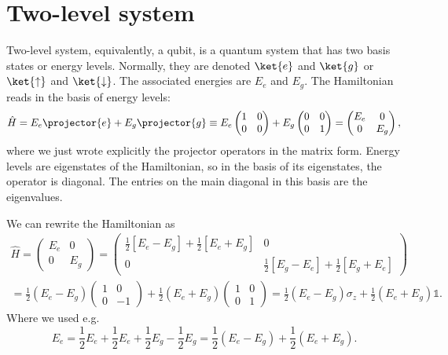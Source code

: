 \documentclass[fontsize=9pt,bookmarkpackage=false]{scrartcl}
\begin{document}
\section*{Two-level system} %
\label{sec:two_level_system}

Two-level system, equivalently, a qubit, is a quantum system that has two basis states or energy levels.
Normally, they are denoted $\ket{e}$ and $\ket{g}$ or $\ket{\uparrow}$ and $\ket{\downarrow}$.
The associated energies are $E_e$ and $E_g$.
The Hamiltonian reads in the basis of energy levels:
\begin{equation}
  \hat H = E_e \projector{e} + E_g \projector{g}
  \equiv
  E_e
  \begin{pmatrix}
    1 & 0 \\ 0 & 0
  \end{pmatrix}
  +
  E_g
  \begin{pmatrix}
    0 & 0 \\ 0 & 1
  \end{pmatrix}
  =
  \begin{pmatrix}
    E_e & 0 \\ 0 & E_g
  \end{pmatrix}
  ,
\end{equation}
where we just wrote explicitly the projector operators in the matrix form.
Energy levels are eigenstates of the Hamiltonian, so in the basis of its eigenstates, the operator is diagonal.
The entries on the main diagonal in this basis are the eigenvalues.

We can rewrite the Hamiltonian as
\begin{multline}
  \label{eq:qubit:hamiltonian}
  \hat H =
  \begin{pmatrix}
    E_e & 0 \\ 0 & E_g
  \end{pmatrix}
  =
  \begin{pmatrix}
    \frac 12 \left[ E_e - E_g \right] + \frac 12 \left[ E_e + E_g \right] & 0
    \\
    0 &
    \frac 12  \left[ E_g - E_e \right] + \frac 12 \left[ E_g + E_e \right]
  \end{pmatrix}
  \\
  =
  \frac 12 ( E_e - E_g )
  \begin{pmatrix}
    1 & 0 \\ 0 & -1
  \end{pmatrix}
  + \frac 12 ( E_e + E_g )
  \begin{pmatrix}
    1 & 0 \\ 0 & 1
  \end{pmatrix}
  =
  \frac 12 ( E_e - E_g ) \sigma_z + \frac 12 ( E_e + E_g ) \mathbb 1.
\end{multline}
Where we used e.g.
\begin{equation}
  E_e = \frac 12 E_e + \frac 12 E_e + \frac 12 E_g - \frac 12 E_g
  =
  \frac 12 ( E_e - E_g ) + \frac 12 ( E_e + E_g ).
\end{equation}
\end{document}
